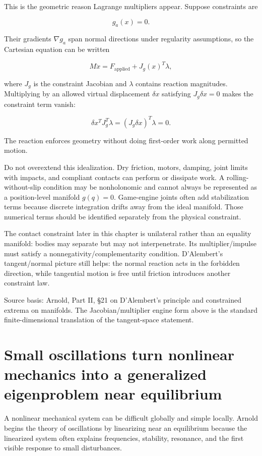 This is the geometric reason Lagrange multipliers appear. Suppose constraints are

\[
g_a(x)=0.
\]

Their gradients \(\nabla g_a\) span normal directions under regularity assumptions, so the Cartesian equation can be written

\[
M\ddot x
=
F_{\mathrm{applied}}
+
J_g(x)^T\lambda,
\]

where \(J_g\) is the constraint Jacobian and \(\lambda\) contains reaction magnitudes. Multiplying by an allowed virtual displacement \(\delta x\) satisfying \(J_g\delta x=0\) makes the constraint term vanish:

\[
\delta x^T J_g^T\lambda
=
(J_g\delta x)^T\lambda
=
0.
\]

The reaction enforces geometry without doing first-order work along permitted motion.

Do not overextend this idealization. Dry friction, motors, damping, joint limits with impacts, and compliant contacts can perform or dissipate work. A rolling-without-slip condition may be nonholonomic and cannot always be represented as a position-level manifold \(g(q)=0\). Game-engine joints often add stabilization terms because discrete integration drifts away from the ideal manifold. Those numerical terms should be identified separately from the physical constraint.

The contact constraint later in this chapter is unilateral rather than an equality manifold: bodies may separate but may not interpenetrate. Its multiplier/impulse must satisfy a nonnegativity/complementarity condition. D'Alembert's tangent/normal picture still helps: the normal reaction acts in the forbidden direction, while tangential motion is free until friction introduces another constraint law.

Source basis: Arnold, Part II, §21 on D'Alembert's principle and constrained extrema on manifolds. The Jacobian/multiplier engine form above is the standard finite-dimensional translation of the tangent-space statement.

\section{Small oscillations turn nonlinear mechanics into a generalized eigenproblem near equilibrium}\label{06-engine-ii-ch033-small-oscillations-turn-nonlinear-mechanics-into-a-generalized-eigenproblem-near-equilibrium}

A nonlinear mechanical system can be difficult globally and simple locally. Arnold begins the theory of oscillations by linearizing near an equilibrium because the linearized system often explains frequencies, stability, resonance, and the first visible response to small disturbances.

